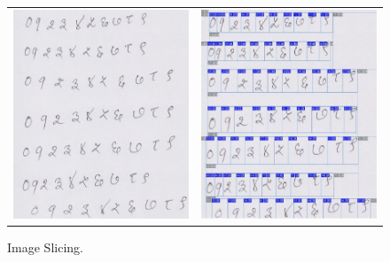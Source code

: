 \begin{figure}[h]
\centering
\begin{tabular}{cc}
\includegraphics[scale=0.70]{figures/system_overview/image_acquisition.eps} & \includegraphics[scale=0.70]{figures/system_overview/image_slicing1.eps}
\end{tabular}
\caption{Image Slicing.}
\label{figure_image_slicing}
\end{figure}
